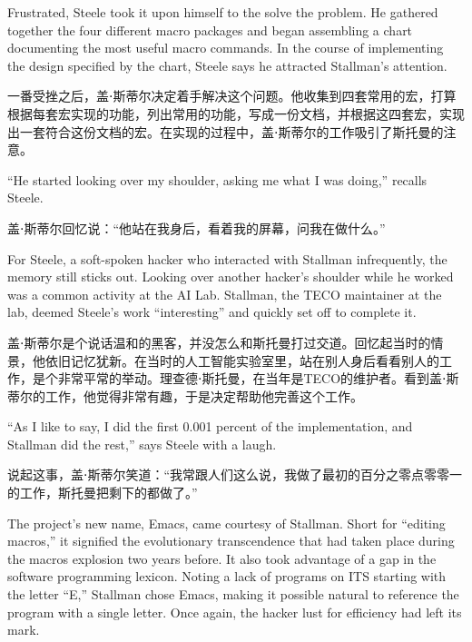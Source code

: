 \ifdefined\eng
Frustrated, Steele took it upon himself to \ifdefined\vone the \fi solve the problem. He gathered together the four different macro packages and began assembling a chart documenting the most useful macro commands. In the course of implementing the design specified by the chart, Steele says he attracted Stallman's attention.
\fi

\ifdefined\chs
一番受挫之后，盖⋅斯蒂尔决定着手解决这个问题。他收集到四套常用的宏，打算根据每套宏实现的功能，列出常用的功能，写成一份文档，并根据这四套宏，实现出一套符合这份文档的宏。在实现的过程中，盖⋅斯蒂尔的工作吸引了斯托曼的注意。
\fi

\ifdefined\eng
``He started looking over my shoulder, asking me what I was doing,'' recalls Steele.
\fi

\ifdefined\chs
盖⋅斯蒂尔回忆说：``他站在我身后，看着我的屏幕，问我在做什么。''
\fi

\ifdefined\eng
For Steele, a soft-spoken hacker who interacted with Stallman infrequently, the memory still sticks out. Looking over another hacker's shoulder while he worked was a common activity at the AI Lab. Stallman, the TECO maintainer at the lab, deemed Steele's work ``interesting'' and quickly set off to complete it.
\fi

\ifdefined\chs
盖⋅斯蒂尔是个说话温和的黑客，并没怎么和斯托曼打过交道。回忆起当时的情景，他依旧记忆犹新。在当时的人工智能实验室里，站在别人身后看看别人的工作，是个非常平常的举动。理查德⋅斯托曼，在当年是TECO的维护者。看到盖⋅斯蒂尔的工作，他觉得非常有趣，于是决定帮助他完善这个工作。
\fi

\ifdefined\eng
``As I like to say, I did the first 0.001 percent of the implementation, and Stallman did the rest,'' says Steele with a laugh.
\fi

\ifdefined\chs
说起这事，盖⋅斯蒂尔笑道：``我常跟人们这么说，我做了最初的百分之零点零零一的工作，斯托曼把剩下的都做了。''
\fi

\ifdefined\eng
The project's new name, Emacs, came courtesy of Stallman. Short for ``editing macros,'' it signified the evolutionary transcendence that had taken place during the macros explosion two years before. It also took advantage of a gap in the software programming lexicon. Noting a lack of programs on ITS starting with the letter ``E,'' Stallman chose Emacs, making it \ifdefined\vone possible \fi\ifdefined\vtwo natural \fi to reference the program with a single letter. Once again, the hacker lust for efficiency had left its mark.
\fi

